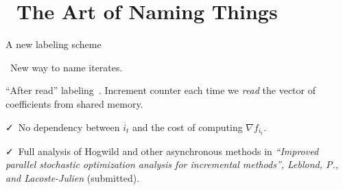\documentclass[10pt]{beamer}
\let\oldparencite=\parencite
\renewcommand{\parencite}[1]{\textcolor[rgb]{1.,.9,.9}{\oldparencite{#1}}}
\begin{document}
{
\section{~The Art of {Naming \color{mDarkTeal} Things}}
}


\begin{frame}{A new labeling scheme}

{\Large\faLightbulbO}~New way to name iterates.

\pause
\vspace{1em}
``After read'' labeling~\parencite{leblond2016Asaga}. Increment counter each time we \emph{read} the vector of coefficients from shared memory.

\pause
\vspace{1em}
{\Large \faCheck}~No dependency between $i_t$ and the cost of computing $\nabla f_{i_t}$.

\vspace{1em}
{\Large \faCheck}~Full analysis of Hogwild and other asynchronous methods in \emph{``Improved parallel stochastic optimization analysis for
incremental methods'', Leblond, P., and Lacoste-Julien} (submitted).
\end{frame}
\end{document}
